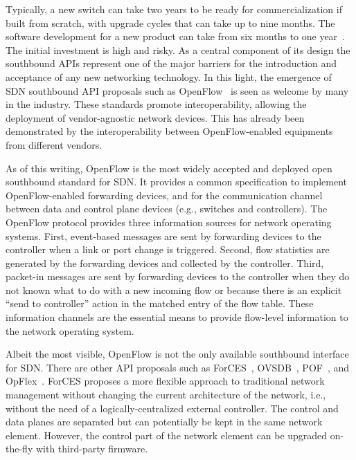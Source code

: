 Typically, a new switch can take two years to be ready for commercialization if built from scratch, 
with upgrade cycles that can take up to nine months. The software development for a new product can 
take from six months to one year~\cite{kato2013}. The initial investment 
is high and risky. 
As a central component of its design the southbound APIs represent one of the major barriers for the introduction 
and acceptance of any new networking technology. 
In this light, the emergence of SDN southbound API proposals such as OpenFlow~\cite{mckeown2008} is seen as welcome by many in the industry.
These standards promote interoperability, allowing the deployment of vendor-agnostic network devices. 
This has already been demonstrated by the interoperability between OpenFlow-enabled equipments from different vendors.

As of this writing, OpenFlow is the most widely accepted and deployed open southbound standard 
for SDN. It provides a common specification to implement OpenFlow-enabled forwarding devices, and for the
communication channel between data and control plane devices (e.g., switches and controllers).
The OpenFlow protocol provides three information sources for network operating systems.
First, event-based messages are sent by forwarding devices to the controller when a link or port 
change is triggered. Second, flow statistics are generated by the forwarding devices and collected 
by the controller. Third, packet-in messages are sent by forwarding devices to the controller when 
they do not known what to do with a new incoming flow or because there is an explicit ``send to 
controller'' action in the matched entry of the flow table. These information channels are the essential 
means to provide flow-level information to the network operating system.

Albeit the most visible, OpenFlow is not the only available southbound interface for SDN.
There are other API proposals such as ForCES~\cite{doria2010}, OVSDB~\cite{pfaff2013-1}, POF~\cite{song2013,song2013-1}, and OpFlex~\cite{smith2014}.
ForCES proposes a more flexible approach to traditional network management without changing the current architecture of the network, i.e., without the need of a logically-centralized external controller. 
The control and data planes are separated but can potentially be kept in the same network element.
However, the control part of the network element can be upgraded on-the-fly with third-party firmware.

